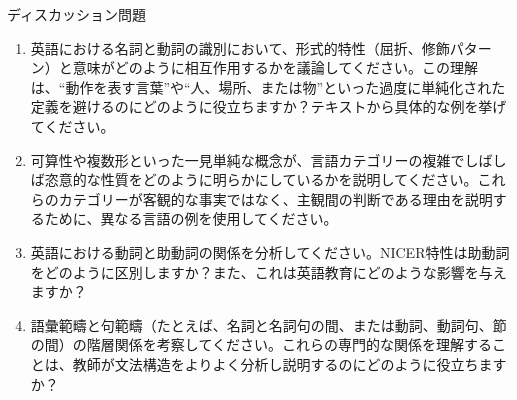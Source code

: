 \begin{tblslineshorizontal}{ディスカッション問題}

\begin{enumerate}[noitemsep]
    \item 英語における名詞と動詞の識別において、形式的特性（屈折、修飾パターン）と意味がどのように相互作用するかを議論してください。この理解は、\enquote{動作を表す言葉}や\enquote{人、場所、または物}といった過度に単純化された定義を避けるのにどのように役立ちますか？テキストから具体的な例を挙げてください。

    \item 可算性や複数形といった一見単純な概念が、言語カテゴリーの複雑でしばしば恣意的な性質をどのように明らかにしているかを説明してください。これらのカテゴリーが客観的な事実ではなく、主観間の判断である理由を説明するために、異なる言語の例を使用してください。

    \item 英語における動詞と助動詞の関係を分析してください。NICER特性は助動詞をどのように区別しますか？また、これは英語教育にどのような影響を与えますか？

    \item 語彙範疇と句範疇（たとえば、名詞と名詞句の間、または動詞、動詞句、節の間）の階層関係を考察してください。これらの専門的な関係を理解することは、教師が文法構造をよりよく分析し説明するのにどのように役立ちますか？
\end{enumerate}

\end{tblslineshorizontal}
